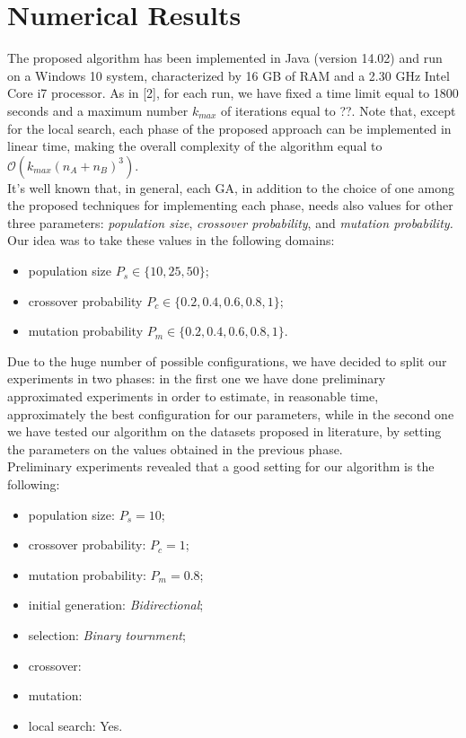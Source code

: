 \documentclass[opre,nonblindrev]{informs3} %
\begin{document}
\section{Numerical Results}
The proposed algorithm has been implemented in Java (version 14.02) and run on a Windows 10 system, characterized by 16 GB of RAM and a 2.30 GHz Intel Core i7 processor. As in [2], for each run, we have fixed a time limit equal to 1800 seconds and a maximum number $k_{max}$ of iterations equal to ??. Note that, except for the local search, each phase of the proposed approach can be implemented in linear time, making the overall complexity of the algorithm equal to $\mathcal{O}(k_{max}(n_A+n_B)^3)$.\\
It's well known that, in general, each GA, in addition to the choice of one among the proposed techniques for implementing each phase, needs also values for other three parameters: \textit{population size}, \textit{crossover probability}, and \textit{mutation probability.}\\
Our idea was to take these values in the following domains:
\begin{itemize}
	\item population size $P_s \in \{10,25,50\}$;
	\item crossover probability $P_c \in \{0.2,0.4,0.6,0.8,1\}$;
	\item mutation probability $P_m \in \{0.2,0.4,0.6,0.8,1\}$.
\end{itemize}
Due to the huge number of possible configurations, we have decided to split our experiments in two phases: in the first one we have done preliminary approximated experiments in order to estimate, in reasonable time, approximately the best configuration for our parameters, while in the second one we have tested our algorithm on the datasets proposed in literature, by setting the parameters on the values obtained in the previous phase.\\
Preliminary experiments revealed that a good setting for our algorithm is the following:
\begin{itemize}
\item population size: $P_s = 10$;
\item crossover probability: $P_c = 1$;
\item mutation probability: $P_m = 0.8$;
\item initial generation: \textit{Bidirectional};
\item selection: \textit{Binary tournment};
\item crossover: 
\item  mutation:
\item local search: Yes.
\end{itemize}
\end{document}
